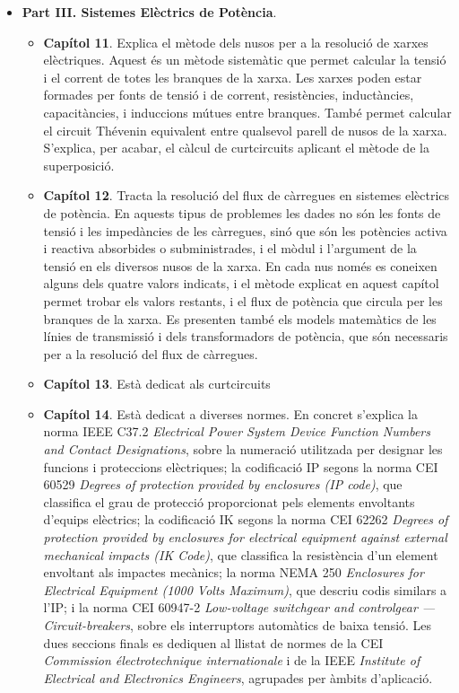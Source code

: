 \begin{itemize}
\begin{itemize}
		\end{itemize}
		\item \textbf{Part III. Sistemes Elèctrics de Potència}. 
		\begin{itemize}
			\item \textbf{Capítol 11}. Explica el mètode dels nusos per a la resolució de xarxes elèctriques. Aquest és un mètode sistemàtic que permet calcular la tensió i el corrent de totes les branques de la xarxa. Les xarxes poden estar  formades per fonts de tensió i de corrent, resistències, inductàncies, capacitàncies, i induccions mútues entre branques. També permet calcular el circuit Thévenin equivalent entre qualsevol parell de nusos de la xarxa. S'explica, per acabar, el càlcul de curtcircuits aplicant el mètode de la superposició.
			\item \textbf{Capítol 12}. Tracta la resolució del  flux de càrregues en sistemes 	elèctrics de potència. En aquests tipus de problemes les dades no són les fonts de tensió i les impedàncies de les càrregues, sinó que són les potències activa i reactiva absorbides o subministrades, i el mòdul i l'argument de la tensió en els diversos nusos de la xarxa. En cada nus només es coneixen alguns dels quatre valors indicats, i el mètode explicat en aquest capítol permet trobar els valors restants, i el flux de potència que circula per les branques de la xarxa. Es presenten també els models matemàtics de les línies de transmissió i dels transformadors de potència, que són necessaris per a la resolució del flux de càrregues.
			\item \textbf{Capítol 13}. Està dedicat als curtcircuits
			\item \textbf{Capítol 14}. Està dedicat a  diverses normes. En concret s'explica la norma IEEE C37.2 \textit{Electrical Power System Device Function Numbers and Contact Designations}, sobre la numeració utilitzada per designar les funcions i proteccions elèctriques; la codificació IP segons la norma CEI 60529 \textit{Degrees of protection provided by enclosures (IP code)}, que classifica el grau de protecció proporcionat pels 			elements envoltants d’equips elèctrics; la codificació IK segons  la norma CEI 62262 \textit{Degrees of protection provided by enclosures for 			electrical equipment against external mechanical impacts (IK Code)}, que  classifica la resistència d’un
			element envoltant als impactes mecànics; la norma
			NEMA 250 \textit{Enclosures for Electrical Equipment (1000 Volts Maximum)}, que descriu codis similars a l'IP; i la norma CEI 60947-2 \textit{Low-voltage switchgear and controlgear --- Circuit-breakers}, sobre els interruptors automàtics de baixa tensió. Les dues seccions finals es dediquen al llistat de normes de la CEI \textit{Commission électrotechnique internationale} i de la IEEE \textit{Institute of Electrical and Electronics Engineers}, agrupades per àmbits d'aplicació.

\end{itemize}
\end{itemize}
